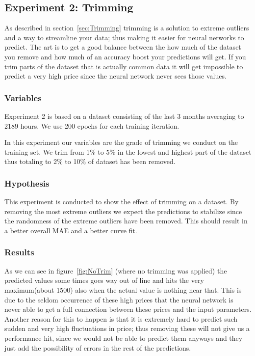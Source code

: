 \newpage
\subsection{Experiment 2: Trimming}
As described in section~\ref{sec:Trimming} trimming is a solution to extreme outliers and a way to streamline your data; thus making it easier for neural networks to predict. The art is to get a good balance between the how much of the dataset you remove and how much of an accuracy boost your predictions will get. If you trim parts of the dataset that is actually common data it will get impossible to predict a very high price since the neural network never sees those values.

\subsubsection{Variables}
Experiment 2 is based on a dataset consisting of the last 3 months averaging to 2189 hours. We use 200 epochs for each training iteration.

In this experiment our variables are the grade of trimming we conduct on the training set. We trim from 1\% to 5\% in the lowest and highest part of the dataset thus totaling to 2\% to 10\% of dataset has been removed.

\subsubsection{Hypothesis}
This experiment is conducted to show the effect of trimming on a dataset. By removing the most extreme outliers we expect the predictions to stabilize since the randomness of the extreme outliers have been removed. This should result in a better overall MAE and a better curve fit.

\subsubsection{Results}

As we can see in figure~\ref{fig:NoTrim} (where no trimming was applied) the predicted values some times goes way out of line and hits the very maximum(about 1500) also when the actual value is nothing near that. This is due to the seldom occurrence of these high prices that the neural network is never able to get a full connection between these prices and the input parameters. Another reason for this to happen is that it is extremely hard to predict such sudden and very high fluctuations in price; thus removing these will not give us a performance hit, since we would not be able to predict them anyways and they just add the possibility of errors in the rest of the predictions.

